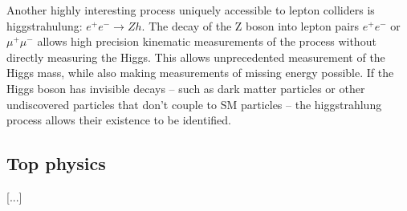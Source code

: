 Another highly interesting process uniquely accessible to lepton colliders is higgstrahulung: $e^+ e^- \rightarrow Zh$. The decay of the Z boson into lepton pairs $e^+ e^-$ or $\mu^+ \mu^-$ allows high precision kinematic measurements of the process without directly measuring the Higgs. This allows unprecedented measurement of the Higgs mass, while also making measurements of missing energy possible. If the Higgs boson has invisible decays -- such as dark matter particles or other undiscovered particles that don't couple to \acrshort{SM} particles -- the higgstrahlung process allows their existence to be identified.


\subsection{Top physics}
[...]


